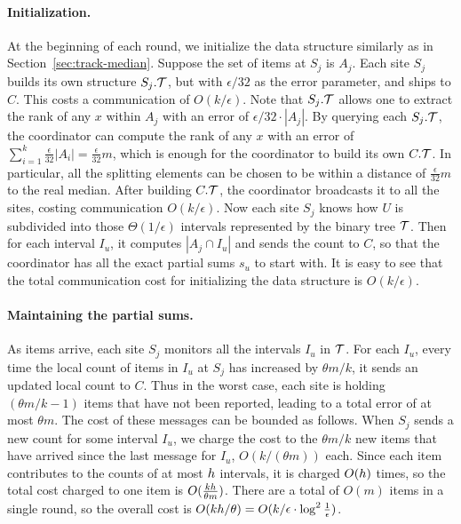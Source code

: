 \documentclass[10pt]{article}
\newcommand{\eps}{\epsilon}
\begin{document}
\paragraph{Initialization.}
At the beginning of each round, we initialize the data structure
similarly as in Section~\ref{sec:track-median}. Suppose the set of
items at $S_j$ is $A_j$. Each site $S_j$ builds its own structure
$S_j.\mathcal{T}$, but with $\eps/32$ as the error parameter, and ships to
$C$.  This costs a communication of $O(k/\eps)$. Note that
$S_j.\mathcal{T}$ allows one to extract the rank of any $x$ within $A_j$
with an error of $\eps/32\cdot |A_j|$. By querying each $S_j.\mathcal{T}$, the
coordinator can compute the rank of any $x$ with an error of
$\sum_{i=1}^k \frac{\eps}{32} |A_i| = \frac{\eps}{32} m$, which is
enough for the coordinator to build its own $C.\mathcal{T}$.  In
particular, all the splitting elements can be chosen to be within
a distance of $\frac{\eps}{32} m$ to the real median. After
building $C.\mathcal{T}$, the coordinator broadcasts it to all the sites,
costing communication $O(k/\eps)$.  Now each site $S_j$ knows how
$U$ is subdivided into those $\Theta(1/\eps)$ intervals represented by the
binary tree $\mathcal{T}$. Then for
each interval $I_u$, it computes $|A_j \cap I_u|$ and sends the count to
$C$, so that the coordinator has all the exact partial sums $s_u$
to start with. It is easy to see that the total communication cost
for initializing the data structure is $O(k/\eps)$.

\paragraph{Maintaining the partial sums.}
As items arrive, each site $S_j$ monitors all the intervals $I_u$
in $\mathcal{T}$. For each $I_u$, every time the local count of items in
$I_u$ at $S_j$ has increased by $\theta m / k$, it sends an
updated local count to $C$.  Thus in the worst case, each site is
holding $(\theta m /k -1)$ items that have not been reported,
leading to a total error of at most $\theta m$.  The cost of these
messages can be bounded as follows.  When $S_j$ sends a new count
for some interval $I_u$, we charge the cost to the $\theta m /k$
new items that have arrived since the last message for $I_u$, $O(k
/ (\theta m))$ each.  Since each item contributes to the counts of
at most $h$ intervals, it is charged $O(h)$ times, so the
total cost charged to one item is $O(\frac{kh}{\theta m})$.
There are a total of $O(m)$ items in a single round, so the
overall cost is $O(k\hmax/\theta) = O(k/\eps \cdot
\log^2\frac{1}{\eps})$.
\end{document}
